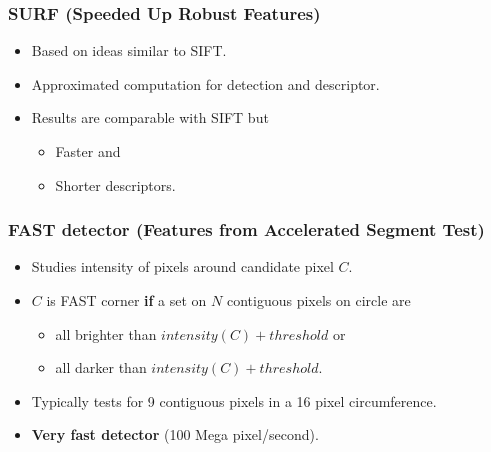 \documentclass[a4paper,12 pt]{article}
\theoremstyle{definition}
\theoremstyle{remark}
\theoremstyle{definition}
\theoremstyle{definition}
\theoremstyle{definition}
\theoremstyle{remark}
\theoremstyle{definition}
\begin{document}
\subsubsection*{SURF (Speeded Up Robust Features)}
\begin{itemize}
\item Based on ideas similar to SIFT.
\item Approximated computation for detection and descriptor.
\item Results are comparable with SIFT but
\begin{itemize}
\item Faster and
\item Shorter descriptors.
\end{itemize}
\end{itemize}
\subsubsection*{FAST detector (Features from Accelerated Segment Test)}
\begin{itemize}
\item Studies intensity of pixels around candidate pixel $C$.
\item $C$ is FAST corner \textbf{if} a set on $N$ contiguous pixels on circle are
\begin{itemize}
\item all brighter than $intensity(C)+threshold$ or
\item all darker than $intensity(C)+threshold$.
\end{itemize}
\item Typically tests for 9 contiguous pixels in a 16 pixel circumference.
\item \textbf{Very fast detector} (100 Mega pixel/second).
\end{itemize}
\end{document}
